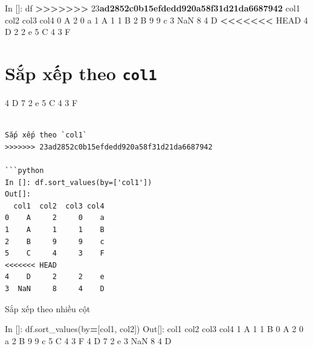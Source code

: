 \documentclass[
]{book}
\newenvironment{Shaded}{\begin{snugshade}}{\end{snugshade}}
\newcommand{\DecValTok}[1]{\textcolor[rgb]{0.00,0.00,0.81}{#1}}
\newcommand{\ErrorTok}[1]{\textcolor[rgb]{0.64,0.00,0.00}{\textbf{#1}}}
\newcommand{\NormalTok}[1]{#1}
\newcommand{\OperatorTok}[1]{\textcolor[rgb]{0.81,0.36,0.00}{\textbf{#1}}}
\newcommand{\StringTok}[1]{\textcolor[rgb]{0.31,0.60,0.02}{#1}}
\begin{document}
\begin{Shaded}
\begin{Highlighting}[]
\NormalTok{In []: df}
\OperatorTok{\textgreater{}\textgreater{}\textgreater{}\textgreater{}\textgreater{}\textgreater{}\textgreater{}} \DecValTok{23}\ErrorTok{ad2852c0b15efdedd920a58f31d21da6687942}
\NormalTok{  col1  col2  col3 col4}
\DecValTok{0}\NormalTok{    A     }\DecValTok{2}     \DecValTok{0}\NormalTok{    a}
\DecValTok{1}\NormalTok{    A     }\DecValTok{1}     \DecValTok{1}\NormalTok{    B}
\DecValTok{2}\NormalTok{    B     }\DecValTok{9}     \DecValTok{9}\NormalTok{    c}
\DecValTok{3}\NormalTok{  NaN     }\DecValTok{8}     \DecValTok{4}\NormalTok{    D}
\OperatorTok{\textless{}\textless{}\textless{}\textless{}\textless{}\textless{}\textless{}}\NormalTok{ HEAD}
\DecValTok{4}\NormalTok{    D     }\DecValTok{2}     \DecValTok{2}\NormalTok{    e}
\DecValTok{5}\NormalTok{    C     }\DecValTok{4}     \DecValTok{3}\NormalTok{    F}
\end{Highlighting}
\end{Shaded}

\chapter{\texorpdfstring{Sắp xếp theo \texttt{col1}}{Sắp xếp theo col1}}\label{sux103p-xuxeap-theo-col1}

4 D 7 2 e
5 C 4 3 F

\begin{verbatim}

Sắp xếp theo `col1`
>>>>>>> 23ad2852c0b15efdedd920a58f31d21da6687942

```python
In []: df.sort_values(by=['col1'])
Out[]:
  col1  col2  col3 col4
0    A     2     0    a
1    A     1     1    B
2    B     9     9    c
5    C     4     3    F
<<<<<<< HEAD
4    D     2     2    e
3  NaN     8     4    D
\end{verbatim}

Sắp xếp theo nhiều cột

\begin{Shaded}
\begin{Highlighting}[]
\NormalTok{In []: df.sort\_values(by}\OperatorTok{=}\NormalTok{[}\StringTok{\textquotesingle{}col1\textquotesingle{}}\NormalTok{, }\StringTok{\textquotesingle{}col2\textquotesingle{}}\NormalTok{])}
\NormalTok{Out[]:}
\NormalTok{  col1  col2  col3 col4}
\DecValTok{1}\NormalTok{    A     }\DecValTok{1}     \DecValTok{1}\NormalTok{    B}
\DecValTok{0}\NormalTok{    A     }\DecValTok{2}     \DecValTok{0}\NormalTok{    a}
\DecValTok{2}\NormalTok{    B     }\DecValTok{9}     \DecValTok{9}\NormalTok{    c}
\DecValTok{5}\NormalTok{    C     }\DecValTok{4}     \DecValTok{3}\NormalTok{    F}
\DecValTok{4}\NormalTok{    D     }\DecValTok{7}     \DecValTok{2}\NormalTok{    e}
\DecValTok{3}\NormalTok{  NaN     }\DecValTok{8}     \DecValTok{4}\NormalTok{    D}
\end{Highlighting}
\end{Shaded}
\end{document}
